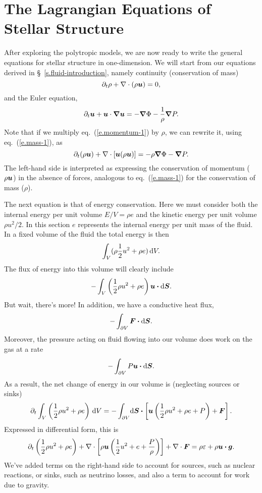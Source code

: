 \chapter[Stellar Structure Equations]{The Lagrangian Equations of Stellar Structure}

After exploring the polytropic models, we are now ready to write the general equations for stellar structure in one-dimension. We will start from our equations derived in \S~\ref{s.fluid-introduction}, namely continuity (conservation of mass)
\begin{equation}\label{e.mass-1}
\partial_{t}\rho + \nabla \cdot(\rho\boldsymbol{u}) = 0,
\end{equation}
and the Euler equation,
\begin{equation}\label{e.momentum-1}
\partial_{t}\boldsymbol{u} + \boldsymbol{u}\cdot\boldsymbol{\nabla}\boldsymbol{u} = -\boldsymbol{\nabla} \Phi - \frac{1}{\rho}\boldsymbol{\nabla} P.
\end{equation}
Note that if we multiply eq.~(\ref{e.momentum-1}) by $\rho$, we can rewrite it, using eq.~(\ref{e.mass-1}), as
\begin{equation}\label{e.momentum-2}
	\partial_{t}(\rho\boldsymbol{u}) + \nabla \cdot[\boldsymbol{u}(\rho\boldsymbol{u})] = -\rho\boldsymbol{\nabla}\Phi -\boldsymbol{\nabla} P.
\end{equation}
The left-hand side is interpreted as expressing the conservation of momentum ($\rho\boldsymbol{u}$) in the absence of forces, analogous to eq.~(\ref{e.mass-1}) for the conservation of mass ($\rho$).

The next equation is that of energy conservation. Here we must consider both the internal energy per unit volume $E/V = \rho e$ and the kinetic energy per unit volume $\rho u^{2}/2$.  In this section $e$ represents the internal energy per unit mass of the fluid. In a fixed volume of the fluid the total energy is then 
\[ \int_{V}(\rho \frac{1}{2}u^{2} + \rho e)\,\mathrm{d} V. \]
The flux of energy into this volume will clearly include
\[ -\int_{V}\left(\frac{1}{2}\rho u^{2} + \rho e\right) \boldsymbol{u}\boldsymbol{\cdot}\mathrm{d}\boldsymbol{S}. \]
But wait, there's more!  In addition, we have a conductive heat flux, 
\[-\int_{\partial V}\boldsymbol{F}\boldsymbol{\cdot}\mathrm{d}\boldsymbol{S}.\] 
Moreover, the pressure acting on fluid flowing into our volume does work on the gas at a rate 
\[-\int_{\partial V}P\boldsymbol{u}\boldsymbol{\cdot}\mathrm{d}\boldsymbol{S}.\] 
As a result, the net change of energy in our volume is (neglecting sources or sinks)
\begin{equation}\label{e.energy-1}
\partial_{t}\int_{V}\left(\frac{1}{2}\rho u^{2} + \rho e\right)\,\mathrm{d} V 
	= -\int_{\partial V} \!\mathrm{d}\boldsymbol{S}\boldsymbol{\cdot}\left[\boldsymbol{u}\left(\frac{1}{2}\rho u^{2} + \rho e + P\right) + \boldsymbol{F}\right].
\end{equation}
Expressed in differential form, this is
\begin{equation}\label{e.energy-2}
 \partial_{t}\left(\frac{1}{2}\rho u^{2} + \rho e\right) 
 	+ \nabla \cdot\left[\rho\boldsymbol{u}\left(\frac{1}{2} u^{2} + e + \frac{P}{\rho}\right)\right]
	+ \nabla \cdot\boldsymbol{F} = \rho\varepsilon + \rho \boldsymbol{u}\boldsymbol{\cdot}\boldsymbol{g}.
\end{equation}
We've added terms on the right-hand side to account for sources, such as nuclear reactions, or sinks, such as neutrino losses, and also a term to account for work due to gravity.

